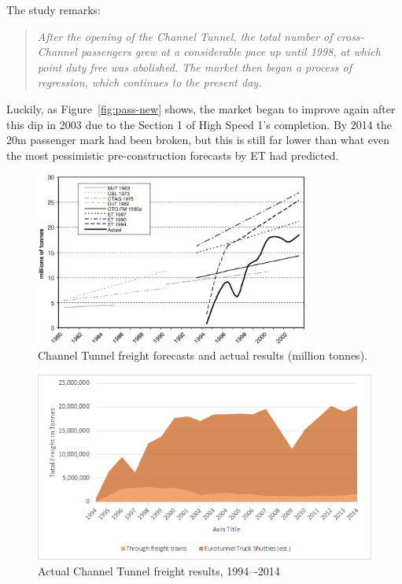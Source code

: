 \documentclass[12pt]{article} %
\begin{document}
The study remarks:
\begin{quote}
\textit{After the opening of the Channel Tunnel, the total number of cross-Channel passengers grew at a considerable pace up until 1998, at which point duty free was abolished. The market then began a process of regression, which continues to the present day.}
\end{quote}

Luckily, as Figure~\ref{fig:pass-new} shows, the market began to improve again after this dip in 2003 due to the Section 1 of High Speed 1's completion. By 2014 the 20m passenger mark had been broken, but this is still far lower than what even the most pessimistic pre-construction forecasts by ET had predicted.

\begin{figure}[hp]
  \centering
  \includegraphics[width=0.8\textwidth]{freight}
  \caption{Channel Tunnel freight forecasts and actual results (million tonnes).}
  \label{fig:freight-fore}
\end{figure}

\begin{figure}[hp]
  \centering
  \includegraphics[width=\textwidth]{freight-new}
  \caption{Actual Channel Tunnel freight results, 1994–-2014}
  \label{fig:freight-new}
\end{figure}
\end{document}
